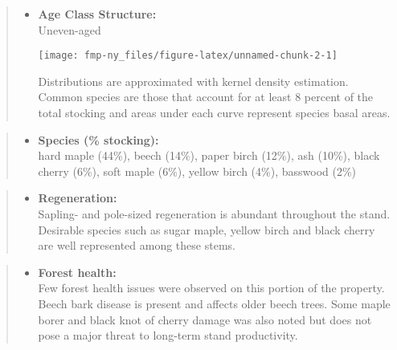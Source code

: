 \documentclass[]{tufte-handout}
\providecommand{\tightlist}{%
  \setlength{\itemsep}{0pt}\setlength{\parskip}{0pt}}
\begin{document}
\begin{quote}
\begin{itemize}
\tightlist
\item
  \textbf{Age Class Structure:}\\
  \vspace{2pt} Uneven-aged\\

  \begin{marginfigure}
  \texttt{[image: fmp-ny\_files/figure-latex/unnamed-chunk-2-1]} \caption[Distributions are approximated with kernel density estimation]{Distributions are approximated with kernel density estimation. Common species are those that account for at least 8 percent of the total stocking and areas under each curve represent species basal areas.}\label{fig:unnamed-chunk-2}
  \end{marginfigure}
\end{itemize}
\end{quote}

\begin{quote}
\begin{itemize}
\tightlist
\item
  \textbf{Species (\% stocking):}\\
  \vspace{2pt} hard maple (44\%), beech (14\%), paper birch (12\%), ash
  (10\%), black cherry (6\%), soft maple (6\%), yellow birch (4\%),
  basswood (2\%)
\end{itemize}
\end{quote}

\begin{quote}
\begin{itemize}
\tightlist
\item
  \textbf{Regeneration:}\\
  \vspace{2pt} Sapling- and pole-sized regeneration is abundant
  throughout the stand. Desirable species such as sugar maple, yellow
  birch and black cherry are well represented among these stems.
\end{itemize}
\end{quote}

\begin{quote}
\begin{itemize}
\tightlist
\item
  \textbf{Forest health:}\\
  \vspace{2pt} Few forest health issues were observed on this portion of
  the property. Beech bark disease is present and affects older beech
  trees. Some maple borer and black knot of cherry damage was also noted
  but does not pose a major threat to long-term stand productivity.
\end{itemize}
\end{quote}
\end{document}
